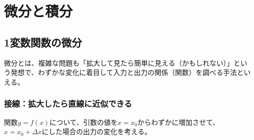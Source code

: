 \documentclass[../math-imaging]{subfiles}
\begin{document}
\chapter{微分と積分}

\section{1変数関数の微分}

微分とは、複雑な問題も「拡大して見たら簡単に見える（かもしれない）」という発想で、わずかな変化に着目して入力と出力の関係（関数）を調べる手法といえる。

\subsection{接線：拡大したら直線に近似できる}

関数$y=f(x)$について、引数の値を$x=x_0$からわずかに増加させて、$x=x_0+\Delta x$にした場合の出力の変化を考える。
\end{document}
